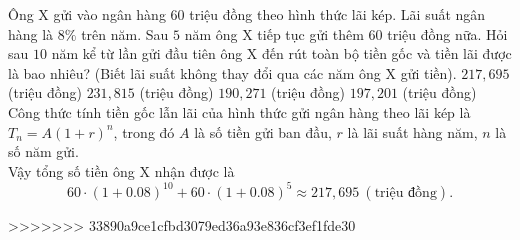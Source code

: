 \begin{ex}%
Ông X gửi vào ngân hàng $60$ triệu đồng theo hình thức lãi kép. Lãi suất ngân hàng là  $8\%$ trên năm. Sau $5$ năm ông X tiếp tục gửi thêm $60$ triệu đồng nữa. Hỏi sau $10$ năm kể từ lần gửi đầu tiên ông X đến rút toàn bộ tiền gốc và tiền lãi được là bao nhiêu? (Biết lãi suất không thay đổi qua các năm ông X gửi tiền).
\choice
{\True $217{,}695$ (triệu đồng)}
{$231{,}815$ (triệu đồng)}
{$190{,}271$ (triệu đồng)}
{$197{,}201$ (triệu đồng)}
\loigiai
{Công thức tính tiền gốc lẫn lãi của hình thức gửi ngân hàng theo lãi kép là $T_n=A(1+r)^n$, trong đó $A$ là số tiền gửi ban đầu, $r$ là lãi suất hàng năm, $n$ là số năm gửi.\\
Vậy tổng số tiền ông X nhận được là $$60\cdot (1+0.08)^{10}+60\cdot (1+0.08)^5\approx 217{,}695\ (\text{triệu đồng}).$$
}
\end{ex}

>>>>>>> 33890a9ce1cfbd3079ed36a93e836cf3ef1fde30
